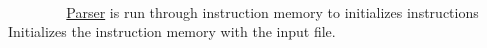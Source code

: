 ~\newline
~\newline
~\newline
~\newline
~\newline
~\newline
~\newline
~\newline
~\newline
~\newline
~\newline
~\newline
~\newline
~\newline
~\newline
~\newline
~\newline
~\newline
~\newline
~\newline
~\newline
~\newline
~\newline
~\newline
~\newline
~\newline
~\newline
~\newline
~\newline
~\newline
~\newline
~\newline
~\newline
~\newline
~\newline
~\newline
~\newline
~\newline
~\newline
~\newline
~\newline
~\newline
~\newline
~\newline
~\newline
~\newline
~\newline
~\newline
 \mbox{\hyperlink{class_parser}{Parser}} is run through instruction memory to initializes instructions Initializes the instruction memory with the input file. ~\newline

